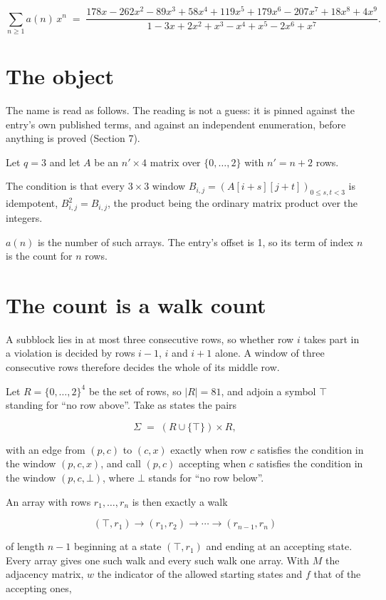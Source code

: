 \documentclass[11pt]{article}
\theoremstyle{definition}
\begin{document}
\[\sum_{n \ge 1} a(n)\,x^n \;=\; \frac{178x - 262x^{2} - 89x^{3} + 58x^{4} + 119x^{5} + 179x^{6} - 207x^{7} + 18x^{8} + 4x^{9}}{1 - 3x + 2x^{2} + x^{3} - x^{4} + x^{5} - 2x^{6} + x^{7}}.\]

\section{The object}

The name is read as follows. The reading is not a guess: it is pinned against the entry's own published terms, and against an independent enumeration, before anything is proved (Section 7).

Let $q = 3$ and let $A$ be an $n' \times 4$ matrix over $\{0,\dots,2\}$ with $n' = n + 2$ rows.

The condition is that every $3 \times 3$ window $B_{i,j} = (A[i{+}s][j{+}t])_{0 \le s,t < 3}$ is idempotent, $B_{i,j}^2 = B_{i,j}$, the product being the ordinary matrix product over the integers.

$a(n)$ is the number of such arrays. The entry's offset is 1, so its term of index $n$ is the count for $n$ rows.

\section{The count is a walk count}

A subblock lies in at most three consecutive rows, so whether row $i$ takes part in a violation is decided by rows $i-1$, $i$ and $i+1$ alone. A window of three consecutive rows therefore decides the whole of its middle row.

Let $R = \{0,\dots,2\}^{4}$ be the set of rows, so $|R| = 81$, and adjoin a symbol $\top$ standing for ``no row above''. Take as states the pairs

\[\Sigma \;=\; (R \cup \{\top\}) \times R,\]

with an edge from $(p,c)$ to $(c,x)$ exactly when row $c$ satisfies the condition in the window $(p,c,x)$, and call $(p,c)$ accepting when $c$ satisfies the condition in the window $(p,c,\bot)$, where $\bot$ stands for ``no row below''.

An array with rows $r_1,\dots,r_n$ is then exactly a walk

\[(\top,r_1) \to (r_1,r_2) \to \cdots \to (r_{n-1},r_n)\]

of length $n-1$ beginning at a state $(\top,r_1)$ and ending at an accepting state. Every array gives one such walk and every such walk one array. With $M$ the adjacency matrix, $w$ the indicator of the allowed starting states and $f$ that of the accepting ones,
\end{document}

